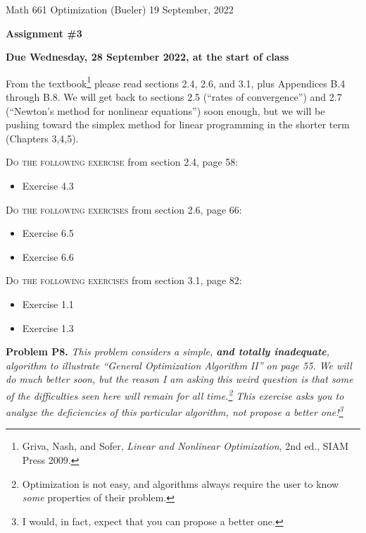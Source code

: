 \documentclass[12pt]{amsart}
\newcommand{\prob}[1]{\bigskip\noindent\textbf{#1}\quad }
\begin{document}
\scriptsize \noindent Math 661 Optimization (Bueler) \hfill 19 September, 2022
\normalsize

\medskip\bigskip

\Large\centerline{\textbf{Assignment \#3}}
\large
\bigskip

\centerline{\textbf{Due Wednesday, 28 September 2022, at the start of class}}
\bigskip
\normalsize

\thispagestyle{empty}

\bigskip
From the textbook\footnote{Griva, Nash, and Sofer, \emph{Linear and Nonlinear Optimization}, 2nd ed., SIAM Press 2009.} please read sections 2.4, 2.6, and 3.1, plus Appendices B.4 through B.8.  We will get back to sections 2.5 (``rates of convergence'') and 2.7 (``Newton's method for nonlinear equations'') soon enough, but we will be pushing toward the simplex method for linear programming in the shorter term (Chapters 3,4,5).

\bigskip
\noindent \textsc{Do the following exercise} from section 2.4, page 58:

\begin{itemize}
\item Exercise 4.3
\end{itemize}

\bigskip
\noindent \textsc{Do the following exercises} from section 2.6, page 66:

\begin{itemize}
\item Exercise 6.5
\item Exercise 6.6
\end{itemize}

\bigskip
\noindent \textsc{Do the following exercises} from section 3.1, page 82:

\begin{itemize}
\item Exercise 1.1
\item Exercise 1.3
\end{itemize}

\prob{Problem P8.}  \emph{This problem considers a simple, \textbf{\emph{and totally inadequate}}, algorithm to illustrate ``General Optimization Algorithm II'' on page 55.  We will do much better soon, but the reason I am asking this weird question is that some of the difficulties seen here will remain for all time.\footnote{Optimization is not easy, and algorithms always require the user to know \emph{some} properties of their problem.}  This exercise asks you to analyze the deficiencies of this particular algorithm, \emph{not} propose a better one!\footnote{I would, in fact, expect that you can propose a better one.}}
\end{document}
